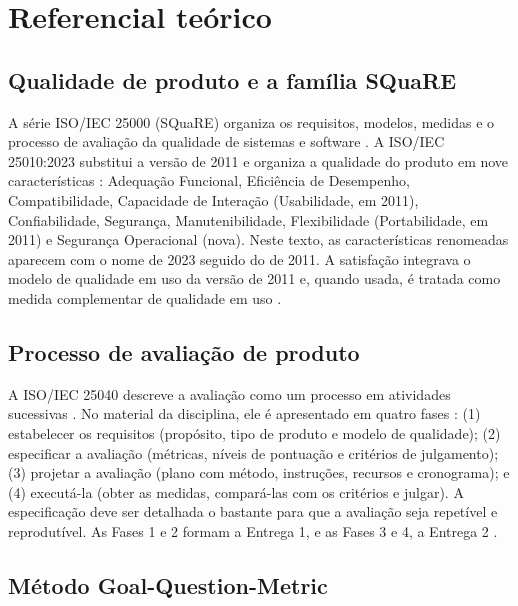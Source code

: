\section{Referencial teórico}
\label{sec:referencial}

\subsection{Qualidade de produto e a família SQuaRE}
\label{sec:square}

A série ISO/IEC 25000 (SQuaRE) organiza os requisitos, modelos, medidas e o processo de avaliação da qualidade de sistemas e software \cite{iso25000}. A ISO/IEC 25010:2023 substitui a versão de 2011 e organiza a qualidade do produto em nove características \cite{iso25010_2023}: Adequação Funcional, Eficiência de Desempenho, Compatibilidade, Capacidade de Interação (Usabilidade, em 2011), Confiabilidade, Segurança, Manutenibilidade, Flexibilidade (Portabilidade, em 2011) e Segurança Operacional (nova). Neste texto, as características renomeadas aparecem com o nome de 2023 seguido do de 2011. A satisfação integrava o modelo de qualidade em uso da versão de 2011 \cite{iso25010_2011} e, quando usada, é tratada como medida complementar de qualidade em uso \cite{iso25022}.

\subsection{Processo de avaliação de produto}
\label{sec:processo}

A ISO/IEC 25040 descreve a avaliação como um processo em atividades sucessivas \cite{iso25040}. No material da disciplina, ele é apresentado em quatro fases \cite{ramos2026processo}: (1) estabelecer os requisitos (propósito, tipo de produto e modelo de qualidade); (2) especificar a avaliação (métricas, níveis de pontuação e critérios de julgamento); (3) projetar a avaliação (plano com método, instruções, recursos e cronograma); e (4) executá-la (obter as medidas, compará-las com os critérios e julgar). A especificação deve ser detalhada o bastante para que a avaliação seja repetível e reprodutível. As Fases 1 e 2 formam a Entrega 1, e as Fases 3 e 4, a Entrega 2 \cite{ramos2026roteiro}.

\subsection{Método Goal-Question-Metric}
\label{sec:gqm}


